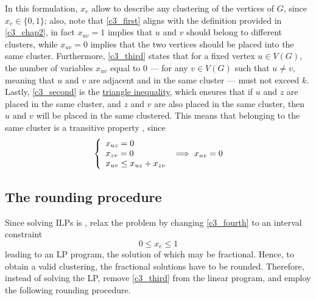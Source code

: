 In this formulation, $x_e$ allow to describe any clustering of the vertices of $G$, since $x_e \in \{0, 1\}$; also, note that \cref{c3_first} aligns with the definition provided in \cref{c3_chap2}, in fact $x_{uv} = 1$ implies that $u$ and $v$ should belong to different clusters, while $x_{uv} = 0$ implies that the two vertices should be placed into the same cluster. Furthermore, \cref{c3_third} states that for a fixed vertex $u \in V(G)$, the number of variables $x_{uv}$ equal to 0 --- for any $v \in V(G)$ such that $u \neq v$, meaning that $u$ and $v$ are adjacent and in the same cluster --- must not exceed $k$. Lastly, \cref{c3_second} is the \href{https://en.wikipedia.org/wiki/Triangle_inequality}{triangle inequality}, which ensures that if $u$ and $z$ are placed in the same cluster, and $z$ and $v$ are also placed in the same cluster, then $u$ and $v$ will be placed in the same clustered. This means that belonging to the same cluster is a transitive property , since $$\soe{l}{x_{uz} = 0 \\ x_{zv} = 0 \\ x_{uv} \le x_{uz} + x_{zv}} \implies x_{uv} = 0$$

\subsection{The rounding procedure}

Since solving ILPs is \NPHard, \textcite{c3} relax the problem by changing \cref{c3_fourth} to an interval constraint $$0 \le x_e \le 1$$ leading to an LP program, the solution of which may be fractional. Hence, to obtain a valid clustering, the fractional solutions have to be rounded. Therefore, instead of solving the LP, \textcite{c3} remove \cref{c3_third} from the linear program, and employ the following rounding procedure.

